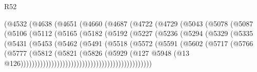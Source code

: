 \begin{lexlean}{R52}
\begin{coremodule}
                        (@4532
                          (@4638
                            (@4651
                              (@4660
                                (@4687
                                  (@4722
                                    (@4729
                                      (@5043
                                        (@5078
                                          (@5087
                                            (@5106
                                              (@5112
                                                (@5165
                                                  (@5182
                                                    (@5192
                                                      (@5227
                                                        (@5236
                                                          (@5294
                                                            (@5329
                                                              (@5335
                                                                (@5431
                                                                  (@5453
                                                                    (@5462
                                                                      (@5491
                                                                        (@5518
                                                                          (@5572
                                                                            (@5591
                                                                              (@5602
                                                                                (@5717
                                                                                  (@5766
                                                                                    (@5777
                                                                                      (@5812
                                                                                        (@5821
                                                                                          (@5826
                                                                                            (@5929
                                                                                              (@127
                                                                                                @5948
                                                                                                (@13
                                                                                                  @126)))))))))))))))))))))))))))))))))))))))))))))))

\end{coremodule}
\end{lexlean}
